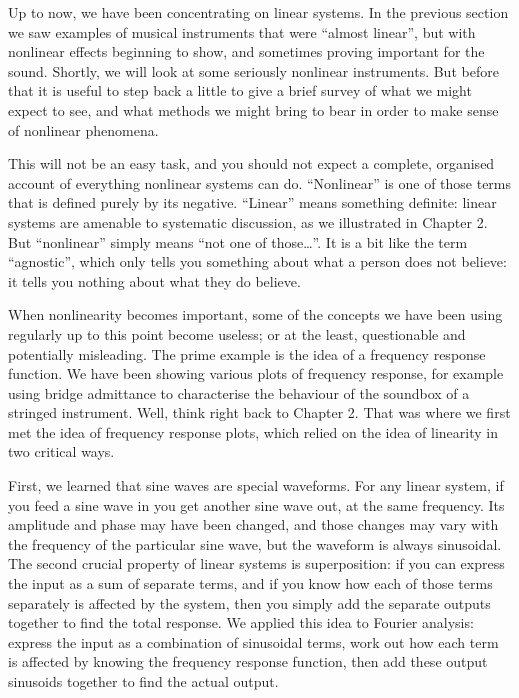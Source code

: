   Up to now, we have been concentrating on linear systems. In the previous 
  section we saw examples of musical instruments that were “almost linear”, but 
  with nonlinear effects beginning to show, and sometimes proving important for 
  the sound. Shortly, we will look at some seriously nonlinear instruments. But 
  before that it is useful to step back a little to give a brief survey of what 
  we might expect to see, and what methods we might bring to bear in order to 
  make sense of nonlinear phenomena. 

  This will not be an easy task, and you should not expect a complete, 
  organised account of everything nonlinear systems can do. “Nonlinear” is one 
  of those terms that is defined purely by its negative. “Linear” means 
  something definite: linear systems are amenable to systematic discussion, as 
  we illustrated in Chapter 2. But “nonlinear” simply means “not one of 
  those…”. It is a bit like the term “agnostic”, which only tells you something 
  about what a person does not believe: it tells you nothing about what they do 
  believe. 

  When nonlinearity becomes important, some of the concepts we have been using 
  regularly up to this point become useless; or at the least, questionable and 
  potentially misleading. The prime example is the idea of a frequency response 
  function. We have been showing various plots of frequency response, for 
  example using bridge admittance to characterise the behaviour of the soundbox 
  of a stringed instrument. Well, think right back to Chapter 2. That was where 
  we first met the idea of frequency response plots, which relied on the idea 
  of linearity in two critical ways. 

  First, we learned that sine waves are special waveforms. For any linear 
  system, if you feed a sine wave in you get another sine wave out, at the same 
  frequency. Its amplitude and phase may have been changed, and those changes 
  may vary with the frequency of the particular sine wave, but the waveform is 
  always sinusoidal. The second crucial property of linear systems is 
  superposition: if you can express the input as a sum of separate terms, and 
  if you know how each of those terms separately is affected by the system, 
  then you simply add the separate outputs together to find the total response. 
  We applied this idea to Fourier analysis: express the input as a combination 
  of sinusoidal terms, work out how each term is affected by knowing the 
  frequency response function, then add these output sinusoids together to find 
  the actual output. 

